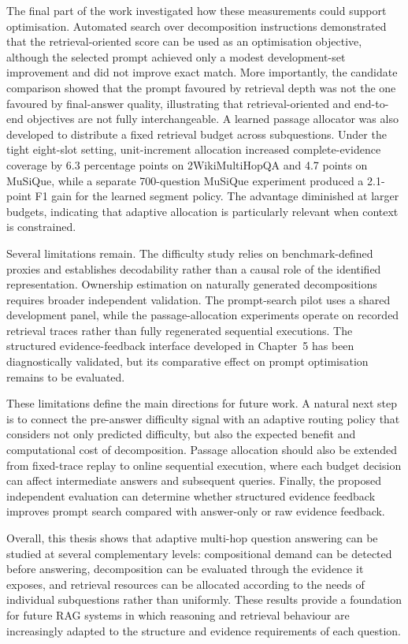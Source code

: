 The final part of the work investigated how these measurements could support
optimisation. Automated search over decomposition instructions demonstrated that
the retrieval-oriented score can be used as an optimisation objective, although
the selected prompt achieved only a modest development-set improvement and did
not improve exact match. More importantly, the candidate comparison showed that
the prompt favoured by retrieval depth was not the one favoured by final-answer
quality, illustrating that retrieval-oriented and end-to-end objectives are not
fully interchangeable. A learned passage allocator was also developed to
distribute a fixed retrieval budget across subquestions. Under the tight
eight-slot setting, unit-increment allocation increased complete-evidence
coverage by 6.3 percentage points on 2WikiMultiHopQA and 4.7 points on MuSiQue,
while a separate 700-question MuSiQue experiment produced a 2.1-point F1 gain
for the learned segment policy. The advantage diminished at larger budgets,
indicating that adaptive allocation is particularly relevant when context is
constrained.

Several limitations remain. The difficulty study relies on benchmark-defined
proxies and establishes decodability rather than a causal role of the identified
representation. Ownership estimation on naturally generated decompositions
requires broader independent validation. The prompt-search pilot uses a shared
development panel, while the passage-allocation experiments operate on recorded
retrieval traces rather than fully regenerated sequential executions. The
structured evidence-feedback interface developed in Chapter~5 has been
diagnostically validated, but its comparative effect on prompt optimisation
remains to be evaluated.

These limitations define the main directions for future work. A natural next
step is to connect the pre-answer difficulty signal with an adaptive routing
policy that considers not only predicted difficulty, but also the expected
benefit and computational cost of decomposition. Passage allocation should also
be extended from fixed-trace replay to online sequential execution, where each
budget decision can affect intermediate answers and subsequent queries.
Finally, the proposed independent evaluation can determine whether structured
evidence feedback improves prompt search compared with answer-only or raw
evidence feedback.

Overall, this thesis shows that adaptive multi-hop question answering can be
studied at several complementary levels: compositional demand can be detected
before answering, decomposition can be evaluated through the evidence it
exposes, and retrieval resources can be allocated according to the needs of
individual subquestions rather than uniformly. These results provide a
foundation for future RAG systems in which reasoning and retrieval behaviour
are increasingly adapted to the structure and evidence requirements of each
question.
